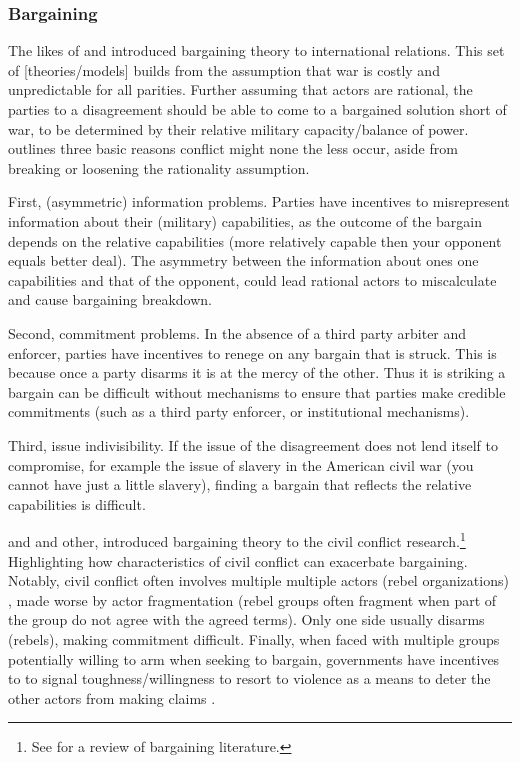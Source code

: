 \subsubsection{Bargaining} \label{Bargaining}


The likes of \citet{Fearon1995} and \citet{Powell2006} introduced bargaining
theory to international relations. This set of [theories/models] builds from the
assumption that war is costly and unpredictable for all parities. Further
assuming that actors are rational, the parties to a disagreement should be able
to come to a bargained solution short of war, to be determined by their relative
military capacity/balance of power. \citet{Fearon1995} outlines three basic
reasons conflict might none the less occur, aside from breaking or loosening
the rationality assumption. 

First, (asymmetric) information problems. Parties have incentives to
misrepresent information about their (military) capabilities, as the outcome of
the bargain depends on the relative capabilities (more relatively capable then
your opponent equals better deal). The asymmetry between the information about
ones one capabilities and that of the opponent, could lead rational actors to
miscalculate and cause bargaining breakdown.

Second, commitment problems. In the absence of a third party arbiter and
enforcer, parties have incentives to renege on any bargain that is struck. This
is because once a party disarms it is at the mercy of the other. Thus it is
striking a bargain can be difficult without mechanisms to ensure that parties
make credible commitments (such as a third party enforcer, or institutional
mechanisms).

Third, issue indivisibility. If the issue of the disagreement does not lend
itself to compromise, for example the issue of slavery in the American civil war
(you cannot have just a little slavery), finding a bargain that reflects the
relative capabilities is difficult.

\citet{Pillar_1983} and \citet{WalterBarbaraF2002CtPT, Walter_1997} and other,
introduced bargaining theory to the civil conflict research.\footnote{See
\citet{Walter2009} for a review of bargaining literature.} Highlighting how
characteristics of civil conflict can exacerbate bargaining. Notably, civil
conflict often involves multiple multiple actors (rebel organizations)
\citep{Cunningham2006}, made worse by actor fragmentation
\citep{Cunningham2013c} (rebel groups often fragment when part of the group do
not agree with the agreed terms). Only one side usually disarms (rebels), making
commitment difficult. Finally, when faced with multiple groups potentially
willing to arm when seeking to bargain, governments have incentives to to signal
toughness/willingness to resort to violence as a means to deter the other actors
from making claims \citep{Walter2006, Walter2009}.

